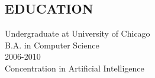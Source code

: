 \documentclass{res}
\begin{document}
 


\address{ 6210 Belcrest Road \\  \#1217 \\ Hyattsville, MD 20782 \\ (609) 948-4264 \\ http://confusedisgood.com \\ jai@confusedisgood.com }

\address{}
                                  
\begin{resume}

\section{EDUCATION}          
    Undergraduate at University of Chicago  \\        
    B.A. in Computer Science   \\   
    2006-2010 \\
    Concentration in Artificial Intelligence      
 

\end{resume}
\end{document}
